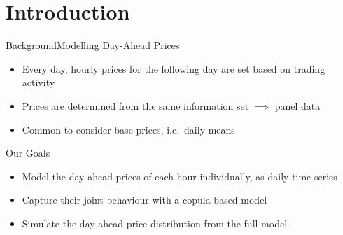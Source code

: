 \section{Introduction}
\label{sec:intro}

\begin{frame}{Background}{Modelling Day-Ahead Prices}
  \begin{itemize}
  \item<2-> Every day, hourly prices for the following day are set based on trading activity
  \item<3-> Prices are determined from the same information set \(\implies\) panel data
  \item<4-> Common to consider base prices, i.e.\ daily means
  \end{itemize}
\end{frame}


\begin{frame}{Our Goals}{}
  \begin{itemize}
  \item<2-> Model the day-ahead prices of each hour individually, as daily time series
  \item<3-> Capture their joint behaviour with a copula-based model
  \item<4-> Simulate the day-ahead price distribution from the full model
  \end{itemize}
\end{frame}

